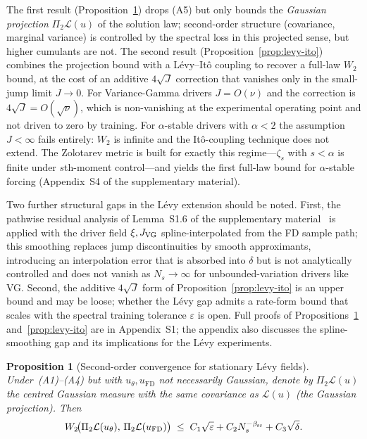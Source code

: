 \documentclass[review,12pt]{elsarticle}
\newtheorem{proposition}{Proposition}
\begin{document}
The first result (Proposition~\ref{thm:levy-ext}) drops (A5) but only
bounds the \emph{Gaussian projection} $\Pi_2\mathcal L(u)$ of the
solution law; second-order structure (covariance, marginal variance)
is controlled by the spectral loss in this projected sense, but
higher cumulants are not. The second result (Proposition~\ref{prop:levy-ito})
combines the projection bound with a L\'evy--It\^o coupling to
recover a full-law $W_2$ bound, at the cost of an additive
$4\sqrt J$ correction that vanishes only in the small-jump limit
$J \to 0$. For Variance-Gamma drivers $J = O(\nu)$ and the
correction is $4\sqrt J = O(\sqrt\nu)$, which is non-vanishing at
the experimental operating point and not driven to zero by training.
For $\alpha$-stable drivers with $\alpha < 2$ the assumption $J <
\infty$ fails entirely: $W_2$ is infinite and the It\^o-coupling
technique does not extend. The Zolotarev metric is built for exactly
this regime---$\zeta_s$ with $s < \alpha$ is finite under
$s$th-moment control---and yields the first full-law bound for
$\alpha$-stable forcing (Appendix~S4 of the supplementary material).

Two further structural gaps in the L\'evy extension should be noted.
First, the pathwise residual analysis of
Lemma~S1.6 of the supplementary material~\cite{MishraMolinaro2022} is applied with the
driver field $\xi, J_{\rm VG}$ spline-interpolated from the FD
sample path; this smoothing replaces jump discontinuities by smooth
approximants, introducing an interpolation error that is absorbed
into $\delta$ but is not analytically controlled and does not
vanish as $N_s \to \infty$ for unbounded-variation drivers like VG.
Second, the additive $4\sqrt J$ form of Proposition~\ref{prop:levy-ito}
is an upper bound and may be loose; whether the L\'evy gap admits a
rate-form bound that scales with the spectral training tolerance
$\varepsilon$ is open. Full proofs of Propositions~\ref{thm:levy-ext}
and~\ref{prop:levy-ito} are in Appendix~S1; the appendix also
discusses the spline-smoothing gap and its implications for the
L\'evy experiments.

\begin{proposition}[Second-order convergence for stationary
L\'evy fields]\label{thm:levy-ext}
Under~(A1)--(A4) but with $u_\theta,u_{\mathrm{FD}}$ not necessarily
Gaussian, denote by $\Pi_2\mathcal L(u)$ the centred Gaussian measure
with the same covariance as $\mathcal L(u)$ (the Gaussian projection).
Then
\[
W_2\!\bigl(\Pi_2\mathcal L(u_\theta),\,
\Pi_2\mathcal L(u_{\mathrm{FD}})\bigr)
\;\le\; C_1\sqrt{\varepsilon} + C_2 N_s^{-\beta_{\rm sr}} + C_3\sqrt\delta.
\]
\end{proposition}
\end{document}
